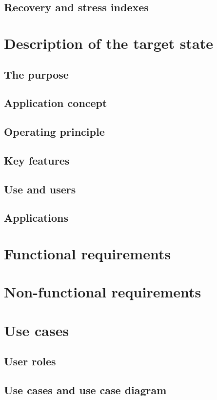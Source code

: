 \documentclass{article}
\begin{document}
\subsection{Recovery and stress indexes}

\section{Description of the target state}
\subsection{The purpose}
\subsection{Application concept}
\subsection{Operating principle}
\subsection{Key features}
\subsection{Use and users}
\subsection{Applications}

\section{Functional requirements}

\section{Non-functional requirements}

\section{Use cases}
\subsection{User roles}
\subsection{Use cases and use case diagram}
\end{document}
